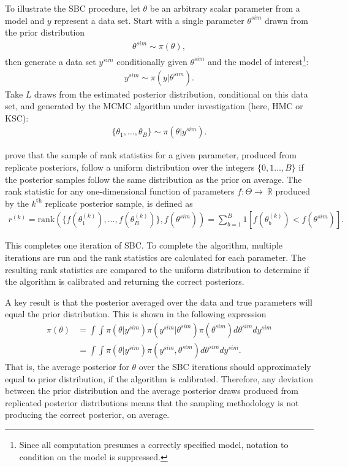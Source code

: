 \documentclass[12pt, a4paper]{article}
\begin{document}
        To illustrate the SBC procedure, let $\theta$ be an arbitrary scalar parameter from a model and $y$ represent a data set. Start with a single parameter $\theta^{sim}$ drawn from the prior distribution
        \begin{align}
        \theta^{sim} \sim \pi(\theta),
        \end{align}
        then generate a data set $y^{sim}$ conditionally given $\theta^{sim}$ and the model of interest\footnote{Since all computation presumes a correctly specified model, notation to condition on the model is suppressed.}:
        \begin{align}
        y^{sim} \sim \pi (y|\theta^{sim}).
        \end{align}
        Take $L$ draws from the estimated posterior distribution, conditional on this data set, and generated by the MCMC algorithm under investigation (here, HMC or KSC):
        \begin{align}
        \{\theta_1,\dots , \theta_{B}\} \sim \pi (\theta | y^{sim}).
        \end{align}

        \citet{talts2020validating} prove that the sample of rank statistics for a given parameter, produced from replicate posteriors, follow a uniform distribution over the integers $\{0,1\dots,B\}$ if the posterior samples follow the same distribution as the prior on average. The rank statistic for any one-dimensional function of parameters $f:\Theta\rightarrow\ \mathbb{R}$ produced by the $k^{\mathrm{th}}$ replicate posterior sample, is defined as
        \begin{align}
        r^{(k)} = \mathrm{rank}(\{f(\theta_1^{(k)}),\dots , f(\theta_{B}^{(k)})\}, f(\theta^{sim})) = \sum_{b=1}^{B}1[f(\theta_{b}^{(k)}) < f(\theta^{sim})].
        \end{align}

        This completes one iteration of SBC. To complete the algorithm, multiple iterations are run and the rank statistics are calculated for each parameter. The resulting rank statistics are compared to the uniform distribution to determine if the algorithm is calibrated and returning the correct posteriors.

        A key result is that the posterior averaged over the data and true parameters will equal the prior distribution. This is shown in the following expression
        \begin{align}
        \pi(\theta) &= \int \int \pi(\theta|y^{sim}) \pi(y^{sim}|\theta^{sim}) \pi(\theta^{sim})d\theta^{sim} dy^{sim} \\
        &= \int \int \pi(\theta|y^{sim}) \pi(y^{sim},\theta^{sim}) d\theta^{sim} dy^{sim}.
        \end{align}
        That is, the average posterior for $\theta$ over the SBC iterations should approximately equal to prior distribution, if the algorithm is calibrated. Therefore, any deviation between the prior distribution and the average posterior draws produced from replicated posterior distributions means that the sampling methodology is not producing the correct posterior, on average.
\end{document}
